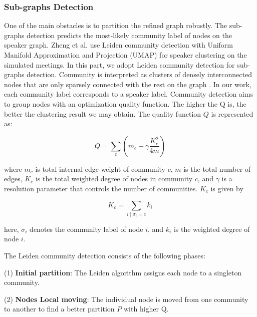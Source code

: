 \documentclass[10pt]{article}
\begin{document}
\subsubsection{Sub-graphs Detection}
One of the main obstacles is to partition the refined graph robustly. The sub-graphs detection predicts the most-likely community label of nodes on the speaker graph. Zheng et al. \cite{zheng2022reformulating} use Leiden community detection\cite{V2019From} with Uniform Manifold Approximation and Projection (UMAP) for speaker clustering on the simulated meetings. In this part, we adopt Leiden community detection for sub-graphs detection. Community is interpreted as clusters of densely interconnected nodes that are only sparsely connected with the rest on the graph \cite{PhysRevE.74.016110}. In our work, each community label corresponds to a speaker label. Community detection aims to group nodes with an optimization quality function. The higher the Q is, the better the clustering result we may obtain. The quality function $Q$ \cite{V2019From} is represented as: 
\vspace{-0.8cm}
\begin{center}
\begin{equation}
Q = \sum_{c} \left(m_c - \gamma\frac{K_c^2}{4m} \right)
\end{equation}
\end{center}
\vspace{-0.1cm}
where $m_c$ is total internal edge weight of community $c$, $m$ is the total number of edges, $K_c$ is the total weighted degree of nodes in community $c$, and $\gamma$ is a resolution parameter that controls the number of communities. $K_c$ is given by
\vspace{-0.8cm}
\begin{center}
\begin{equation}
K_c = \sum_{i \mid \sigma_i = c} k_i
\end{equation}
\end{center}
\vspace{-0.1cm}
here, $\sigma_i$ denotes the community label of node $i$, and $k_i$ is the weighted degree of node $i$. 

The Leiden community detection consists of the following phases:

(1) \textbf{Initial partition}: The Leiden algorithm assigns each node to a singleton community.

(2) \textbf{Nodes Local moving}: The individual node is moved from one community to another to find a better partition $P$ with higher Q. 
\end{document}
